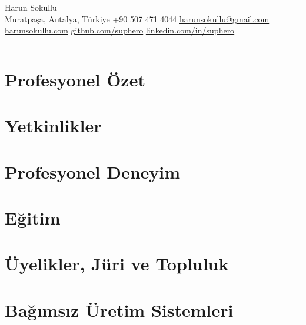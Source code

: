 \documentclass[10pt,a4paper]{article}
\newcommand{\sectiondivider}{\par\vspace{4pt}\noindent\textcolor{accent}{\rule{\linewidth}{0.6pt}}\vspace{6pt}}
\begin{document}
\raggedright

\begin{center}
  {\LARGE Harun Sokullu}\\[4pt]
  Muratpaşa, Antalya, Türkiye \textbar{} +90 507 471 4044 \textbar{} \href{mailto:harunsokullu@gmail.com}{harunsokullu@gmail.com}\\
  \href{https://harunsokullu.com}{harunsokullu.com} \textbar{} \href{https://github.com/suphero}{github.com/suphero} \textbar{} \href{https://www.linkedin.com/in/suphero}{linkedin.com/in/suphero}
\end{center}

\sectiondivider

\section*{Profesyonel Özet}


\section*{Yetkinlikler}


\section*{Profesyonel Deneyim}


\section*{Eğitim}


\section*{Üyelikler, Jüri ve Topluluk}


\section*{Bağımsız Üretim Sistemleri}

\end{document}
